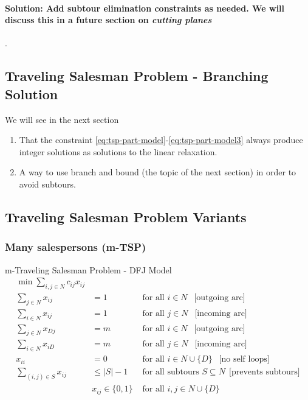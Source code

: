 \paragraph{Solution: Add subtour elimination constraints as needed.  We will discuss this in a future section on \emph{cutting planes}}.

\subsection{Traveling Salesman Problem - Branching Solution}
We will see in the next section
\begin{enumerate}
\item That the constraint \eqref{eq:tsp-part-model}-\eqref{eq:tsp-part-model3}  always produce integer solutions as solutions to the linear relaxation.
\item A way to use branch and bound (the topic of the next section) in order to avoid subtours.
\end{enumerate}


\subsection{Traveling Salesman Problem Variants}

\subsubsection{Many salespersons (m-TSP)}
\begin{general}{m-Traveling Salesman Problem - DFJ Model}{}
\begin{align}
\label{eq:tsp-DFJ-model}
\min \sum_{i,j \in N} c_{ij} x_{ij}\\
\sum_{j\in N} x_{ij} &= 1 & \text{ for all } i \in N \ \ \text{ [outgoing arc]}\\
\sum_{i \in N} x_{ij} &= 1 & \text{ for all } j \in N \ \ \text{ [incoming arc]}\\
\sum_{j\in N} x_{Dj} &= m & \text{ for all } i \in N \ \ \text{ [outgoing arc]}\\
\sum_{i \in N} x_{iD} &= m & \text{ for all } j \in N \ \ \text{ [incoming arc]}\\
x_{ii} &= 0 & \text{ for all } i \in N\cup\{D\} \ \ \text{ [no self loops]} \\
\sum_{(i,j) \in S} x_{ij} &\leq |S| -1  & \text{ for all subtours } S\subseteq N \ \ \text{[prevents subtours]}\\
& x_{ij} \in \{0,1\} & \text{ for all } i,j \in N\cup\{D\}
\end{align}
\end{general}


